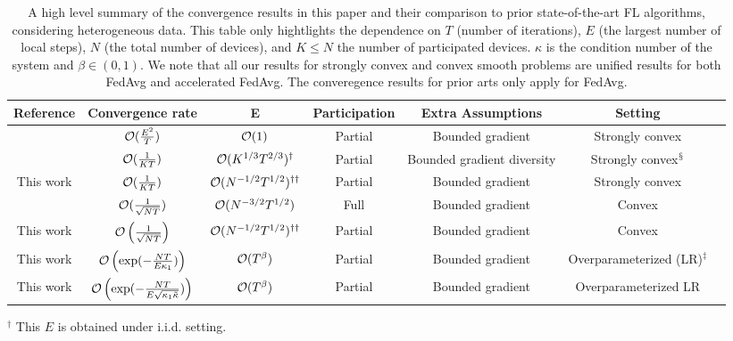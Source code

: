 \begin{table}[h!]
\centering
\hspace{-2em}
{\small
\begin{tabular}{|c|c|c|c|c|c|c|}
\hline Reference                 & Convergence rate    & E                           			& Participation & Extra Assumptions  		  & Setting  \\ \hline\hline 
\cite{li2019convergence}         & ${\mathcal{O}}(\frac{E^2}{T})$& ${\mathcal{O}}(1)$                    			& Partial       & Bounded gradient   		  & Strongly convex  \\ \hline
\cite{haddadpour2019convergence} & ${\mathcal{O}}(\frac{1}{KT})$ & ${\mathcal{O}}(K^{1/3}T^{2/3})^{\dagger}$     			& Partial       & Bounded gradient diversity   & Strongly convex$^{\mathsection}$  \\ \hline
This work                        & ${\mathcal{O}}(\frac{1}{KT})$ & ${\mathcal{O}}(N^{-1/2}T^{1/2})^{\dagger\dagger}$ 			& Partial       & Bounded gradient             & Strongly convex  \\\hline\hline
\cite{zanette2019tighter}  & ${\mathcal{O}}(\frac{1}{\sqrt{NT}})$ & ${\mathcal{O}}(N^{-3/2}T^{1/2})$     			& Full        & Bounded gradient             & Convex  \\\hline
This work      & ${\mathcal{O}}\left(\frac{1}{\sqrt{NT}}\right)$ &  ${\mathcal{O}}(N^{-1/2}T^{1/2})^{\dagger\dagger}$			& Partial     & Bounded gradient            &  Convex   \\ \hline\hline
This work & ${\mathcal{O}}\left(\exp(-\frac{NT}{E\kappa_1})\right)$ & $ {\mathcal{O}}(T^{\beta})$                   &  Partial     & Bounded gradient    & Overparameterized (LR)$^{\ddagger}$ \\ \hline
This work & ${\mathcal{O}}\left(\exp(-\frac{NT}{E\sqrt{\kappa_1\tilde{\kappa}}})\right)$ & $ {\mathcal{O}}(T^{\beta})$  &  Partial     & Bounded gradient    & Overparameterized LR \\ \hline
\end{tabular}
}
\caption{A high level summary of the convergence results in this paper and their comparison to prior state-of-the-art FL algorithms, considering heterogeneous data. This table only hightlights the
dependence on $T$ (number of iterations), $E$ (the largest number of local steps), $N$ (the total number of devices), and $K\leq N$ the number of participated devices. 
$\kappa$ is the condition number of the system and $\beta \in (0,1)$. 
We note that all our results for strongly convex and convex smooth problems are unified results for both FedAvg and accelerated FedAvg. The converegence results for prior arts only apply for FedAvg.}
{\raggedright 
         $^{\dagger}$ This $E$ is obtained under i.i.d. setting. \\
}
\end{table}
